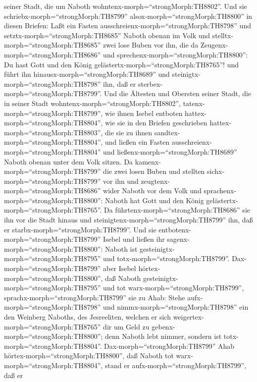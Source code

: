 seiner Stadt, die um Naboth wohntenx-morph=``strongMorph:TH8802''.
 Und sie schriebx-morph=``strongMorph:TH8799''
alsox-morph=``strongMorph:TH8800'' in diesen Briefen: Laßt ein Fasten
ausschreienx-morph=``strongMorph:TH8798'' und
setztx-morph=``strongMorph:TH8685'' Naboth obenan im Volk 
und stelltx-morph=``strongMorph:TH8685'' zwei lose Buben vor ihn, die da
Zeugenx-morph=``strongMorph:TH8686'' und
sprechenx-morph=``strongMorph:TH8800'': Du hast Gott und den König
gelästertx-morph=``strongMorph:TH8765''! und führt ihn
hinausx-morph=``strongMorph:TH8689'' und
steinigtx-morph=``strongMorph:TH8798'' ihn, daß er
sterbex-morph=``strongMorph:TH8799''.  Und die Ältesten und
Obersten seiner Stadt, die in seiner Stadt
wohntenx-morph=``strongMorph:TH8802'',
tatenx-morph=``strongMorph:TH8799'', wie ihnen Isebel entboten
hattex-morph=``strongMorph:TH8804'', wie sie in den Briefen geschrieben
hattex-morph=``strongMorph:TH8803'', die sie zu ihnen
sandtex-morph=``strongMorph:TH8804'',  und ließen ein
Fasten ausschreienx-morph=``strongMorph:TH8804'' und
ließenx-morph=``strongMorph:TH8689'' Naboth obenan unter dem Volk
sitzen.  Da kamenx-morph=``strongMorph:TH8799'' die zwei
losen Buben und stellten sichx-morph=``strongMorph:TH8799'' vor ihn und
zeugtenx-morph=``strongMorph:TH8686'' wider Naboth vor dem Volk und
sprachenx-morph=``strongMorph:TH8800'': Naboth hat Gott und den König
gelästertx-morph=``strongMorph:TH8765''. Da
führtenx-morph=``strongMorph:TH8686'' sie ihn vor die Stadt hinaus und
steinigtenx-morph=``strongMorph:TH8799'' ihn, daß er
starbx-morph=``strongMorph:TH8799''.  Und sie
entbotenx-morph=``strongMorph:TH8799'' Isebel und ließen ihr
sagenx-morph=``strongMorph:TH8800'': Naboth ist
gesteinigtx-morph=``strongMorph:TH8795'' und
totx-morph=``strongMorph:TH8799''. 
Dax-morph=``strongMorph:TH8799'' aber Isebel
hörtex-morph=``strongMorph:TH8800'', daß Naboth
gesteinigtx-morph=``strongMorph:TH8795'' und tot
warx-morph=``strongMorph:TH8799'', sprachx-morph=``strongMorph:TH8799''
sie zu Ahab: Stehe aufx-morph=``strongMorph:TH8798'' und
nimmx-morph=``strongMorph:TH8798'' ein den Weinberg Naboths, des
Jesreeliten, welchen er sich weigertex-morph=``strongMorph:TH8765'' dir
um Geld zu gebenx-morph=``strongMorph:TH8800''; denn Naboth lebt nimmer,
sondern ist totx-morph=``strongMorph:TH8804''. 
Dax-morph=``strongMorph:TH8799'' Ahab
hörtex-morph=``strongMorph:TH8800'', daß Naboth tot
warx-morph=``strongMorph:TH8804'', stand er
aufx-morph=``strongMorph:TH8799'', daß er
